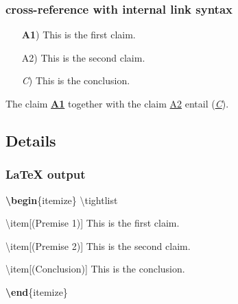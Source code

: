 \documentclass[
]{article}
\newenvironment{Shaded}{}{}
\newcommand{\ExtensionTok}[1]{#1}
\newcommand{\FunctionTok}[1]{\textcolor[rgb]{0.02,0.16,0.49}{#1}}
\newcommand{\KeywordTok}[1]{\textcolor[rgb]{0.00,0.44,0.13}{\textbf{#1}}}
\newcommand{\NormalTok}[1]{#1}
\providecommand{\tightlist}{%
  \setlength{\itemsep}{0pt}\setlength{\parskip}{0pt}}
\begin{document}
\hypertarget{cross-reference-with-internal-link-syntax}{%
\subsubsection{cross-reference with internal link
syntax}\label{cross-reference-with-internal-link-syntax}}

\begin{itemize}
\tightlist

\item[\textbf{A1})]\protect\hypertarget{A1ref}{}{} This is the first
claim.

\item[A2)]\protect\hypertarget{A2ref}{}{} This is the second claim.

\item[\emph{C})]\protect\hypertarget{Cref}{}{} This is the conclusion.

\end{itemize}

The claim \protect\hyperlink{A1ref}{\textbf{A1}} together with the claim
\protect\hyperlink{A2ref}{A2} entail
(\protect\hyperlink{Cref}{\emph{C}}).

\hypertarget{details}{%
\subsection{Details}\label{details}}

\hypertarget{latex-output}{%
\subsubsection{LaTeX output}\label{latex-output}}

\begin{Shaded}
\begin{Highlighting}[]
\KeywordTok{\textbackslash{}begin}\NormalTok{\{}\ExtensionTok{itemize}\NormalTok{\}}
\FunctionTok{\textbackslash{}tightlist}

\FunctionTok{\textbackslash{}item}\NormalTok{[(Premise 1)] This is the first claim.}

\FunctionTok{\textbackslash{}item}\NormalTok{[(Premise 2)] This is the second claim.}

\FunctionTok{\textbackslash{}item}\NormalTok{[(Conclusion)] This is the conclusion.}

\KeywordTok{\textbackslash{}end}\NormalTok{\{}\ExtensionTok{itemize}\NormalTok{\}}
\end{Highlighting}
\end{Shaded}
\end{document}
